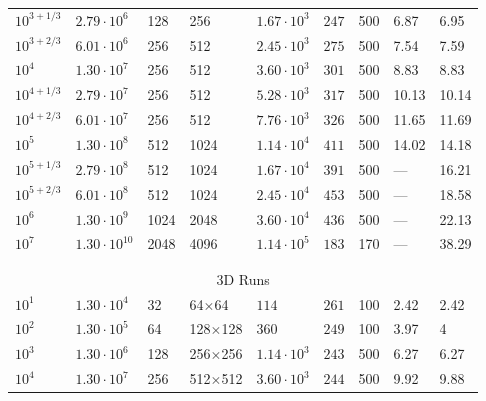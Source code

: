 \documentclass[aps, pre, onecolumn, nofootinbib, notitlepage, groupedaddress, amsfonts, amssymb, amsmath, longbibliography]{revtex4-1}
\begin{document}
\begin{table}
\begin{center}
\begin{tabularx}{\textwidth}{ X X X X | X X X | X X }
$10^{3 + 1/3}$	&	$2.79 \cdot 10^6$	&	128	&	256	&	$1.67 \cdot 10^3$	&	$247$	&	500	&	6.87	&	6.95	\\
$10^{3 + 2/3}$	&	$6.01 \cdot 10^6$	&	256	&	512	&	$2.45 \cdot 10^3$	&	$275$	&	500	&	7.54	&	7.59	\\
$10^4$	&	$1.30 \cdot 10^7$	&	256	&	512	&	$3.60 \cdot 10^3$	&	$301$	&	500	&	8.83	&	8.83	\\
$10^{4 + 1/3}$	&	$2.79 \cdot 10^7$	&	256	&	512	&	$5.28 \cdot 10^3$	&	$317$	&	500	&	10.13	&	10.14	\\
$10^{4 + 2/3}$	&	$6.01 \cdot 10^7$	&	256	&	512	&	$7.76 \cdot 10^3$	&	$326$	&	500	&	11.65	&	11.69	\\
$10^5$	&	$1.30 \cdot 10^8$	&	512	&	1024	&	$1.14 \cdot 10^4$	&	$411$	&	500	&	14.02	&	14.18	\\
$10^{5 + 1/3}$	&	$2.79 \cdot 10^8$	&	512	&	1024	&	$1.67 \cdot 10^4$	&	$391$	&	500	&	---	&	16.21	\\
$10^{5 + 2/3}$	&	$6.01 \cdot 10^8$	&	512	&	1024	&	$2.45 \cdot 10^4$	&	$453$	&	500	&	---	&	18.58	\\
$10^6$	&	$1.30 \cdot 10^9$	&	1024	&	2048	&	$3.60 \cdot 10^4$	&	$436$	&	500	&	---	&	22.13	\\
$10^7$	&	$1.30 \cdot 10^{10}$	&	2048	&	4096	&	$1.14 \cdot 10^5$	&	$183$	&	170	&	---	&	38.29	\\
\\ \hline \hline \\																	
\multicolumn{9}{c}{3D Runs} \\
\hline
$10^1$	&	$1.30 \cdot 10^4$	&	32	&	64$\times$64	&	$114$	&	$261$	&	100	&	2.42	&	2.42	\\
$10^2$	&	$1.30 \cdot 10^5$	&	64	&	128$\times$128	&	$360$	&	$249$	&	100	&	3.97	&	4	\\
$10^3$	&	$1.30 \cdot 10^6$	&	128	&	256$\times$256	&	$1.14 \cdot 10^3$	&	$243$	&	500	&	6.27	&	6.27	\\
$10^4$	&	$1.30 \cdot 10^7$	&	256	&	512$\times$512	&	$3.60 \cdot 10^3$	&	$244$	&	500	&	9.92	&	9.88	\\
\hline																	
\end{tabularx}
\end{center}
\end{table}






\end{document}
